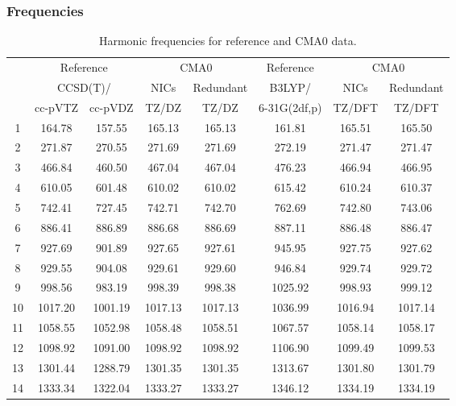 \documentclass[10pt,oneside]{article}
\begin{document}
\begin{table}[h!]
\subsubsection*{Frequencies}
\centering
\caption{Harmonic frequencies for reference and CMA0 data.}
\begin{tabular}{cccccccc}
\toprule
{} & \multicolumn{2}{c}{Reference} & \multicolumn{2}{c}{CMA0} &    Reference & \multicolumn{2}{c}{CMA0} \\
{} & \multicolumn{2}{c}{CCSD(T)/} &    NICs &  Redundant &       B3LYP/ &    NICs & Redundant \\
{} &   cc-pVTZ & cc-pVDZ &   TZ/DZ &      TZ/DZ & 6-31G(2df,p) &  TZ/DFT &    TZ/DFT \\
\midrule
1  &    164.78 &  157.55 &  165.13 &     165.13 &       161.81 &  165.51 &    165.50 \\
2  &    271.87 &  270.55 &  271.69 &     271.69 &       272.19 &  271.47 &    271.47 \\
3  &    466.84 &  460.50 &  467.04 &     467.04 &       476.23 &  466.94 &    466.95 \\
4  &    610.05 &  601.48 &  610.02 &     610.02 &       615.42 &  610.24 &    610.37 \\
5  &    742.41 &  727.45 &  742.71 &     742.70 &       762.69 &  742.80 &    743.06 \\
6  &    886.41 &  886.89 &  886.68 &     886.69 &       887.11 &  886.48 &    886.47 \\
7  &    927.69 &  901.89 &  927.65 &     927.61 &       945.95 &  927.75 &    927.62 \\
8  &    929.55 &  904.08 &  929.61 &     929.60 &       946.84 &  929.74 &    929.72 \\
9  &    998.56 &  983.19 &  998.39 &     998.38 &      1025.92 &  998.93 &    999.12 \\
10 &   1017.20 & 1001.19 & 1017.13 &    1017.13 &      1036.99 & 1016.94 &   1017.14 \\
11 &   1058.55 & 1052.98 & 1058.48 &    1058.51 &      1067.57 & 1058.14 &   1058.17 \\
12 &   1098.92 & 1091.00 & 1098.92 &    1098.92 &      1106.90 & 1099.49 &   1099.53 \\
13 &   1301.44 & 1288.79 & 1301.35 &    1301.35 &      1313.67 & 1301.80 &   1301.79 \\
14 &   1333.34 & 1322.04 & 1333.27 &    1333.27 &      1346.12 & 1334.19 &   1334.19 \\

\end{tabular}
\end{table}
\end{document}
